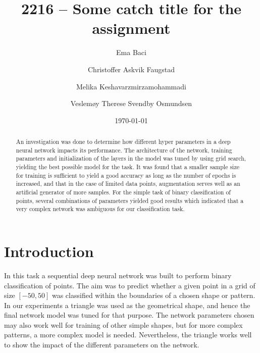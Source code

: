 \documentclass[prl,twocolumn]{revtex4-1}
\begin{document}
\title{2216 -- Some catch title for the assignment}

\author{Ema Baci}
\author{Christoffer Askvik Faugstad}
\author{Melika Keshavarzmirzamohammadi}
\author{Veslemøy Therese Svendby Osmundsen}

\date{\today}

\begin{abstract}
An investigation was done to determine how different hyper parameters in a deep neural network impacts its performance. The architecture of the network, training parameters and initialization of the layers in the model was tuned by using grid search, yielding the best possible model for the task. It was found that a smaller sample size for training is sufficient to yield a good accuracy as long as the number of epochs is increased, and that in the case of limited data points, augmentation serves well as an artificial generator of more samples. For the simple task of binary classification of points, several combinations of parameters yielded good results which indicated that a very complex network was ambiguous for our classification task. 

\end{abstract}

\maketitle

\section{Introduction}
In this task a sequential deep neural network was built to perform binary classification of points. The aim was to predict whether a given point in a grid of size $\left[-50,50\right]$ was classified within the boundaries of a chosen shape or pattern. In our experiments a triangle was used as the geometrical shape, and hence the final network model was tuned for that purpose. The network parameters chosen may also work well for training of other simple shapes, but for more complex patterns, a more complex model is needed. Nevertheless, the triangle works well to show the impact of the different parameters on the network.

\end{document}
